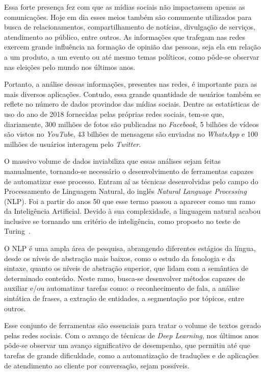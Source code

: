 Essa forte presença fez com que as mídias sociais não impactassem apenas as
comunicações.
Hoje em dia esses meios também são comumente utilizados para busca de
relacionamentos, compartilhamento de notícias, divulgação de serviços,
atendimento ao público, entre outros.
As informações que trafegam nas redes exercem grande influência na formação de
opinião das pessoas, seja ela em relação a um produto, a um evento ou até mesmo
temas políticos, como pôde-se observar nas eleições pelo mundo nos últimos anos.

Portanto, a análise dessas informações, presentes nas redes, é importante para
as mais diversos aplicações.
Contudo, essa grande quantidade de usuários também se reflete no número de dados
provindos das mídias sociais.
Dentre as estatísticas de uso do ano de 2018 fornecidas pelas próprias redes
sociais, tem-se que, diariamente, 300 milhões de fotos são publicadas no
\textit{Facebook}, 5 bilhões de vídeos são vistos no \textit{YouTube}, 43
bilhões de mensagens são enviadas no \textit{WhatsApp} e 100 milhões de usuários
interagem pelo \textit{Twitter}.

O massivo volume de dados inviabiliza que essas análises sejam feitas
manualmente, tornando-se necessário o desenvolvimento de ferramentas capazes de
automatizar esse processo.
Entram aí as técnicas desenvolvidas pelo campo do Processamento de Linguagem
Natural, do inglês \textit{Natural Language Processing} (NLP).
Foi a partir do anos 50 que esse termo passou a aparecer como um ramo da
Inteligência Artificial.
Devido à sua complexidade, a linguagem natural acabou inclusive se tornando um
critério de inteligência, como proposto no teste de Turing~\cite{turing50}.

O NLP é uma ampla área de pesquisa, abrangendo diferentes estágios da língua,
desde os níveis de abstração mais baixos, como o estudo da fonologia e da
sintaxe, quanto os níveis de abstração superior, que lidam com a semântica de
determinado conteúdo.
Neste ramo, busca-se desenvolver métodos capazes de auxiliar e/ou automatizar
tarefas como: o reconhecimento de fala, a análise sintática de frases, a
extração de entidades, a segmentação por tópicos, entre outros.

Esse conjunto de ferramentas são essenciais para tratar o volume de textos
gerado pelas redes sociais.  Com o avanço de técnicas de \textit{Deep Learning},
nos últimos anos pôde-se observar um avanço significativo de desempenho, que
permitiu até que tarefas de grande dificuldade, como a automatização de traduções
e de aplicações de atendimento ao cliente por conversação, sejam possíveis.

